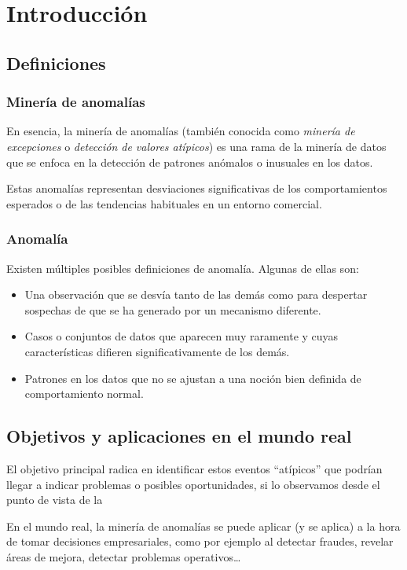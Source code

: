\chapter{Introducción}
\section{Definiciones}
\subsection{Minería de anomalías}
En esencia, la minería de anomalías (también conocida como \textit{minería de excepciones} o
\textit{detección de valores atípicos}) es una rama de la minería de datos que se enfoca en
la detección de patrones anómalos o inusuales en los datos.

Estas anomalías representan desviaciones significativas de los comportamientos esperados
o de las tendencias habituales en un entorno comercial.
\subsection{Anomalía}
Existen múltiples posibles definiciones de anomalía. Algunas de ellas son:
\begin{itemize}[topsep=0pt]
	\item Una observación que se desvía tanto de las demás como para despertar sospechas de
		que se ha generado por un mecanismo diferente.
	\item Casos o conjuntos de datos que aparecen muy raramente y cuyas características
		difieren significativamente de los demás.
	\item Patrones en los datos que no se ajustan a una noción bien definida de comportamiento
		normal.
\end{itemize}

\section{Objetivos y aplicaciones en el mundo real}
El objetivo principal radica en identificar estos eventos ``atípicos'' que podrían llegar
a indicar problemas o posibles oportunidades, si lo observamos desde el punto de vista de
la \subject.

En el mundo real, la minería de anomalías se puede aplicar (y se aplica) a la hora de
tomar decisiones empresariales, como por ejemplo al detectar fraudes, revelar áreas de
mejora, detectar problemas operativos\ldots

